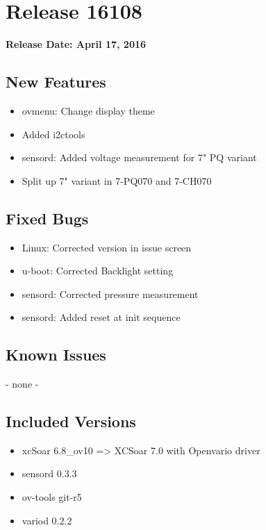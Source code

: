 \chapter*{Release 16108}

\begin{flushleft}
	\textbf{Release Date: April 17, 2016}
\end{flushleft}

\section*{New Features}

\begin{itemize}
	\item ovmenu: Change display theme
	\item Added i2ctools
	\item sensord: Added voltage measurement for 7" PQ variant
	\item Split up 7" variant in 7-PQ070 and 7-CH070
\end{itemize}

\section*{Fixed Bugs}
\begin{itemize}
	\item Linux: Corrected version in issue screen
	\item u-boot: Corrected Backlight setting
	\item sensord: Corrected pressure measurement
	\item sensord: Added reset at init sequence
\end{itemize}

\section*{Known Issues}
	- none -

\section*{Included Versions}

\begin{itemize}
	\item xcSoar 6.8\_ov10 => XCSoar 7.0 with Openvario driver
	\item sensord 0.3.3
	\item ov-tools git-r5
	\item variod 0.2.2
\end{itemize}